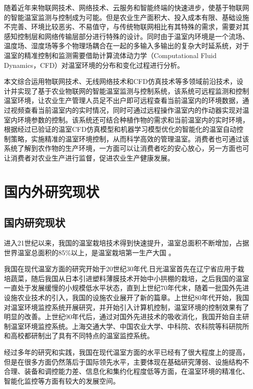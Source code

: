 随着近年来物联网技术、网络技术、云服务和智能终端的快速进步，使基于物联网的智能温室监测与控制成为可能。但是农业生产面积大、投入成本有限、基础设施不完善、环境比较恶劣、不易值守，与传统物联网相比有其特殊的需求，需要对其感知控制层和网络传输层部分进行特殊的设计。同时由于温室内环境是一个流场、温度场、湿度场等多个物理场耦合在一起的多输入多输出的复杂大时延系统，对于温室的精准控制和监测需要借助计算流体动力学（Computational Fluid Dynamics，CFD）对温室环境的分布和变化过程进行分析。

本文综合运用物联网技术、无线网络技术和CFD仿真技术等多领域前沿技术，设计并实现了基于农业物联网的智能温室监测与控制系统，该系统可远程监测和控制温室环境，让农业生产管理人员足不出户即可远程查看当前温室内的环境数据，通过视频查看当前温室内的实时情况，同时可通过远程操作温室内的作动器实现对温室内环境参数的控制。该系统还可结合种植作物的需求和当前温室内的实时环境，根据经过已验证的温室CFD仿真模型和机器学习模型优化的智能化的温室自动控制策略，实施精准的温室环境控制，从而科学高效的管理温室。消费者也可通过该系统了解到农作物的生产环境，一方面可以让消费者吃的安心放心，另一方面也可让消费者对农业生产进行监督，促进农业生产健康发展。

\section{国内外研究现状}
	\subsection{国内研究现状}
进入21世纪以来，我国的温室栽培技术得到快速提升，温室总面积不断增加，占据世界温室总面积的85\%以上，是温室栽培第一生产大国\supercite{GuoShirong2012ZGSC} 。
	
我国在现代温室方面的研究开始于20世纪30年代,日光温室首先在辽宁省应用于栽培蔬菜，随后我国从日本引进塑料薄膜技术开始中小拱棚的栽培，之后我国的温室一直处于发展缓慢的小规模低水平状态，直到上世纪70年代末，随着一批国外先进设施农业技术的引入，我国的设施农业展开了新的篇章\supercite{ZhouChangji2010}。上世纪80年代开始，我国对温室环境监控系统开展研究，并开始引入计算机控制，温室环境的控制效果有了明显的改善\supercite{HanYi2016}。上世纪90年代后，通过对国外先进技术的吸收消化，我国开始自主研制温室环境监控系统。上海交通大学、中国农业大学、中科院、农科院等科研院所和高校都研制出了具有不同特点的温室监控系统。

经过多年的研究和实践，我国在现代温室方面的水平已经有了很大程度上的提高，但是在很多方面仍然落后于国际领先水平，主要体现在基础研究薄弱、设施结构不合理、装备和调控能力差、信息化和集约化程度低等方面\supercite{ZhangZhen2015,JiangWeijie2015}，在温室环境的精准化、智能化监控等方面有较大的发展空间。


